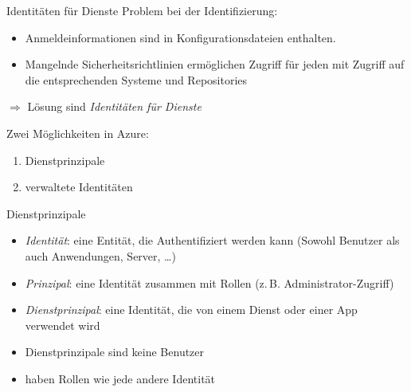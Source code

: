 \begin{flashcard}[\ ]{Identitäten für Dienste}
        Problem bei der Identifizierung:
        \begin{itemize}
            \item Anmeldeinformationen sind in Konfigurationsdateien enthalten.
            \item Mangelnde Sicherheitsrichtlinien ermöglichen Zugriff für jeden mit Zugriff auf die entsprechenden Systeme und Repositories
        \end{itemize}
        $\Rightarrow$ Lösung sind \emph{Identitäten für Dienste}

        Zwei Möglichkeiten in Azure:
        \begin{enumerate}
            \item Dienstprinzipale
            \item verwaltete Identitäten
        \end{enumerate}
\end{flashcard}

\begin{flashcard}[Definition]{Dienstprinzipale}
        \begin{itemize}
            \item \emph{Identität}: eine Entität, die Authentifiziert werden kann\newline
                (Sowohl Benutzer als auch Anwendungen, Server, …)
            \item \emph{Prinzipal}: eine Identität zusammen mit Rollen\newline
                (z.\,B. Administrator-Zugriff)
            \item \emph{Dienstprinzipal}: eine Identität, die von einem Dienst oder einer App verwendet wird
            \item[$\Rightarrow $] Dienstprinzipale sind keine Benutzer
            \item haben Rollen wie jede andere Identität
        \end{itemize}
\end{flashcard}

